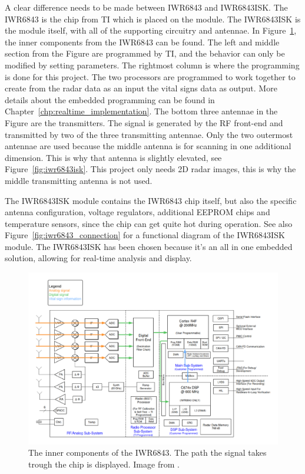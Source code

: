 A clear difference needs to be made between IWR6843 and IWR6843ISK. The IWR6843 is the chip from TI which is placed on the module. The IWR6843ISK is the module itself, with all of the supporting circuitry and antennae. In Figure~\ref{fig:iwr6843_inner}, the inner components from the IWR6843 can be found. The left and middle section from the Figure are programmed by TI, and the behavior can only be modified by setting parameters. The rightmost column is where the programming is done for this project. The two processors are programmed to work together to create from the radar data as an input the vital signs data as output. More details about the embedded programming can be found in Chapter~\ref{chp:realtime_implementation}. The bottom three antennae in the Figure are the transmitters. The signal is generated by the RF front-end and transmitted by two of the three transmitting antennae. Only the two outermost antennae are used because the middle antenna is for scanning in one additional dimension. This is why that antenna is slightly elevated, see Figure~\ref{fig:iwr6843isk}. This project only needs 2D radar images, this is why the middle transmitting antenna is not used.

The IWR6843ISK module contains the IWR6843 chip itself, but also the specific antenna configuration, voltage regulators, additional EEPROM chips and temperature sensors, since the chip can get quite hot during operation. See also Figure~\ref{fig:iwr6843_connection} for a functional diagram of the IWR6843ISK module. The IWR6843ISK has been chosen because it's an all in one embedded solution, allowing for real-time analysis and display. 


\begin{figure}[t]
\centering
\includegraphics[width=\textwidth]{figures/background/IWR inner2.pdf}
\caption{The inner components of the IWR6843. The path the signal takes trough the chip is displayed. Image from \cite{iwr6843isk_website}.}
\label{fig:iwr6843_inner}
\end{figure}

